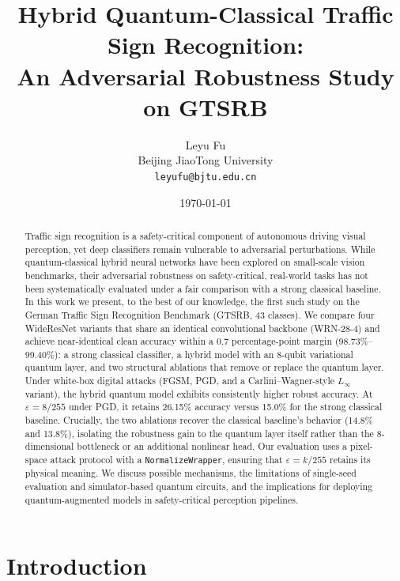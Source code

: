 \documentclass[11pt]{article}
\title{Hybrid Quantum-Classical Traffic Sign Recognition:\\
An Adversarial Robustness Study on GTSRB}
\author{%
  Leyu Fu\\
  Beijing JiaoTong University\\
  \texttt{leyufu@bjtu.edu.cn}\\
}
\date{\today}
\newcommand{\eps}{\varepsilon}
\begin{document}
\maketitle

\begin{abstract}
Traffic sign recognition is a safety-critical component of autonomous driving
visual perception, yet deep classifiers remain vulnerable to adversarial
perturbations. While quantum-classical hybrid neural networks have been
explored on small-scale vision benchmarks, their adversarial robustness on
safety-critical, real-world tasks has not been systematically evaluated under
a fair comparison with a strong classical baseline. In this work we present,
to the best of our knowledge, the first such study on the German Traffic
Sign Recognition Benchmark (GTSRB, 43 classes). We compare four WideResNet
variants that share an identical convolutional backbone (WRN-28-4) and
achieve near-identical clean accuracy within a 0.7 percentage-point margin
(98.73\%--99.40\%): a strong classical classifier, a hybrid model with an
8-qubit variational quantum layer, and two structural ablations that remove
or replace the quantum layer. Under white-box digital attacks (FGSM, PGD,
and a Carlini--Wagner-style $L_\infty$ variant), the hybrid quantum model
exhibits consistently higher robust accuracy. At $\eps = 8/255$ under PGD,
it retains 26.15\% accuracy versus 15.0\% for the strong classical baseline.
Crucially, the two ablations recover the classical baseline's
behavior (14.8\% and 13.8\%), isolating the robustness gain to the quantum
layer itself rather than the 8-dimensional bottleneck or an additional
nonlinear head. Our evaluation uses a pixel-space attack protocol with a
\texttt{NormalizeWrapper}, ensuring that $\eps = k/255$ retains its
physical meaning. We discuss possible mechanisms, the limitations of
single-seed evaluation and simulator-based quantum circuits, and the
implications for deploying quantum-augmented models in safety-critical
perception pipelines.
\end{abstract}

\section{Introduction}
\label{sec:intro}
\end{document}
